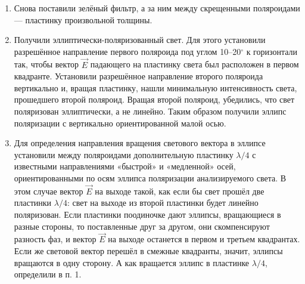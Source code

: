 \documentclass[a4paper,12pt]{article}
\begin{document}
\begin{enumerate}
		\item Снова поставили зелёный фильтр, а за ним между скрещенными поляроидами --- пластинку произвольной толщины.
		\item Получили эллиптически-поляризованный свет. Для этого установили разрешённое направление первого поляроида под углом 10–20$^\circ$ к горизонтали так, чтобы вектор $\vec{E}$ падающего на пластинку света был расположен в первом квадранте. Установили разрешённое направление второго поляроида вертикально и, вращая пластинку, нашли минимальную интенсивность света, прошедшего второй поляроид. Вращая второй поляроид, убедились, что свет поляризован эллиптически, а не линейно. Таким образом получили эллипс поляризации с вертикально ориентированной малой осью.
		\item Для определения направления вращения светового вектора в эллипсе 	установили между поляроидами дополнительную пластинку $\lambda/4$ с известными направлениями «быстрой» и «медленной» осей, ориентированными по осям эллипса поляризации анализируемого света. В этом случае вектор $\vec{E}$ на выходе такой, как если бы свет прошёл две пластинки $\lambda/4$: свет на выходе из второй пластинки будет линейно поляризован. Если пластинки поодиночке дают эллипсы, вращающиеся в разные стороны, то поставленные друг за другом, они скомпенсируют разность фаз, и вектор $\vec{E}$ на выходе останется в первом и третьем квадрантах. Если же световой вектор перешёл в смежные квадранты, значит, эллипсы вращаются в одну сторону. А как вращается эллипс в пластинке $\lambda/4$, определили в п. 1.
	\end{enumerate}
\end{document}
